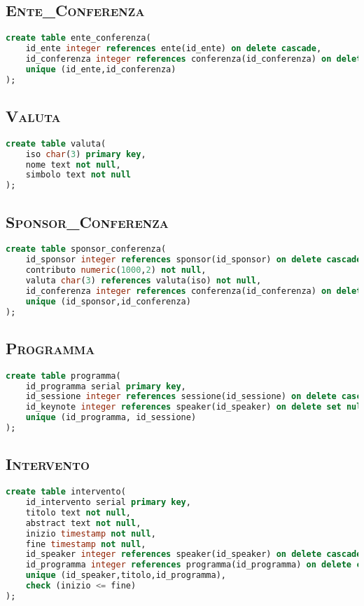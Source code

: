 \subsection{\textsc{Ente\_Conferenza}}
\begin{lstlisting}[language=SQL,style=mystyle, caption={Tabella: Ente\_Conferenza}]
create table ente_conferenza(
    id_ente integer references ente(id_ente) on delete cascade,
    id_conferenza integer references conferenza(id_conferenza) on delete cascade,
    unique (id_ente,id_conferenza)
);
\end{lstlisting}
\subsection{\textsc{Valuta}}
\begin{lstlisting}[language=SQL,style=mystyle,caption={Tabella: Valuta}]
create table valuta(
    iso char(3) primary key,
    nome text not null,
    simbolo text not null
);
\end{lstlisting}
\subsection{\textsc{Sponsor\_Conferenza}}
\begin{lstlisting}[language=SQL,style=mystyle, caption={Tabella: Sponsor\_Conferenza}]
create table sponsor_conferenza(
    id_sponsor integer references sponsor(id_sponsor) on delete cascade not null,
    contributo numeric(1000,2) not null,
    valuta char(3) references valuta(iso) not null,
    id_conferenza integer references conferenza(id_conferenza) on delete cascade not null,
    unique (id_sponsor,id_conferenza) 
);
\end{lstlisting}
\subsection{\textsc{Programma}}
\begin{lstlisting}[language=SQL,style=mystyle,caption={Tabella: Programma}]
create table programma(
    id_programma serial primary key,
    id_sessione integer references sessione(id_sessione) on delete cascade not null,
    id_keynote integer references speaker(id_speaker) on delete set null,
    unique (id_programma, id_sessione)
);
\end{lstlisting}
\subsection{\textsc{Intervento}}
\begin{lstlisting}[language=SQL,style=mystyle, caption={Tabella: Intervento}]
create table intervento(
    id_intervento serial primary key,
    titolo text not null,
    abstract text not null,
    inizio timestamp not null,
    fine timestamp not null,
    id_speaker integer references speaker(id_speaker) on delete cascade,
    id_programma integer references programma(id_programma) on delete cascade not null,
    unique (id_speaker,titolo,id_programma), 
    check (inizio <= fine) 
);
\end{lstlisting}
